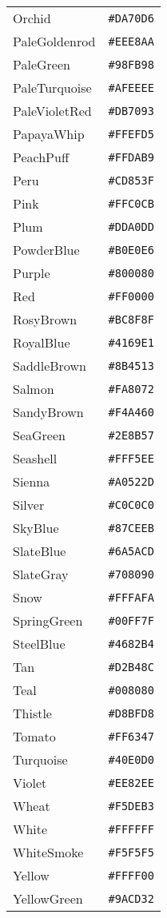 \documentclass[a4paper]{article}
\begin{document}
\begin{longtable}{|l|r|}
Orchid & \texttt{\#DA70D6} \\
PaleGoldenrod & \texttt{\#EEE8AA} \\
PaleGreen & \texttt{\#98FB98} \\
PaleTurquoise & \texttt{\#AFEEEE} \\
PaleVioletRed & \texttt{\#DB7093} \\
PapayaWhip & \texttt{\#FFEFD5} \\
PeachPuff & \texttt{\#FFDAB9} \\
Peru & \texttt{\#CD853F} \\
Pink & \texttt{\#FFC0CB} \\
Plum & \texttt{\#DDA0DD} \\
PowderBlue & \texttt{\#B0E0E6} \\
Purple & \texttt{\#800080} \\
Red & \texttt{\#FF0000} \\
RosyBrown & \texttt{\#BC8F8F} \\
RoyalBlue & \texttt{\#4169E1} \\
SaddleBrown & \texttt{\#8B4513} \\
Salmon & \texttt{\#FA8072} \\
SandyBrown & \texttt{\#F4A460} \\
SeaGreen & \texttt{\#2E8B57} \\
Seashell & \texttt{\#FFF5EE} \\
Sienna & \texttt{\#A0522D} \\
Silver & \texttt{\#C0C0C0} \\
SkyBlue & \texttt{\#87CEEB} \\
SlateBlue & \texttt{\#6A5ACD} \\
SlateGray & \texttt{\#708090} \\
Snow & \texttt{\#FFFAFA} \\
SpringGreen & \texttt{\#00FF7F} \\
SteelBlue & \texttt{\#4682B4} \\
Tan & \texttt{\#D2B48C} \\
Teal & \texttt{\#008080} \\
Thistle & \texttt{\#D8BFD8} \\
Tomato & \texttt{\#FF6347} \\
Turquoise & \texttt{\#40E0D0} \\
Violet & \texttt{\#EE82EE} \\
Wheat & \texttt{\#F5DEB3} \\
White & \texttt{\#FFFFFF} \\
WhiteSmoke & \texttt{\#F5F5F5} \\
Yellow & \texttt{\#FFFF00} \\
YellowGreen & \texttt{\#9ACD32} \\
\hline
\end{longtable}
\end{document}
